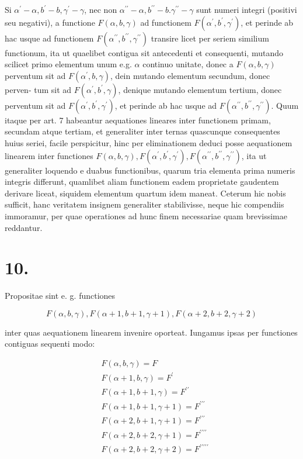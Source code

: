 \documentclass[twoside,12pt, showframe]{memoir}
\begin{document}
Si \(\alpha^{\prime}-\alpha, b^{\prime}-b, \gamma^{\prime}-\gamma\), nec non \(\alpha^{\prime \prime}-\alpha, b^{\prime \prime}-b . \gamma^{\prime \prime}-\gamma\) sunt numeri integri (positivi seu negativi), a functione \(F(\alpha, b, \gamma)\) ad functionem \(F\left(\alpha^{\prime}, b^{\prime}, \gamma^{\prime}\right)\), et perinde ab hac usque ad functionem \(F\left(\alpha^{\prime \prime}, b^{\prime \prime}, \gamma^{\prime \prime}\right)\) transire licet per seriem similium functionum, ita ut quaelibet contigua sit antecedenti et consequenti, mutando scilicet primo elementum unum e.g. \(\alpha\) continuo unitate, donec a \(F(\alpha, b, \gamma)\) perventum sit ad \(F\left(\alpha^{\prime}, b, \gamma\right)\), dein mutando elementum secundum, donec perven-
tum sit ad \(F\left(\alpha^{\prime}, b^{\prime}, \gamma\right)\), denique mutando elementum tertium, donec perventum sit ad \(F\left(\alpha^{\prime}, b^{\prime}, \gamma^{\prime}\right)\), et perinde ab hac usque ad \(F\left(\alpha^{\prime \prime}, b^{\prime \prime}, \gamma^{\prime \prime}\right)\). Quum itaque per art. 7 habeantur aequationes lineares inter functionem primam, secundam atque tertiam, et generaliter inter ternas quascunque consequentes huius seriei, facile perspicitur, hinc per eliminationem deduci posse aequationem linearem inter functiones \(F(\alpha, b, \gamma), F\left(\alpha^{\prime}, b^{\prime}, \gamma^{\prime}\right), F\left(\alpha^{\prime \prime}, b^{\prime \prime}, \gamma^{\prime \prime}\right)\), ita ut generaliter loquendo e duabus functionibus, quarum tria elementa prima numeris integris differunt, quamlibet aliam functionem eadem proprietate gaudentem derivare liceat, siquidem elementum quartum idem maneat. Ceterum hic nobis sufficit, hanc veritatem insignem generaliter stabilivisse, neque hic compendiis immoramur, per quae operationes ad hunc finem necessariae quam brevissimae reddantur.

\section*{10.}
Propositae sint e. g. functiones

\[
F(\alpha, b, \gamma), F(\alpha+1, b+1, \gamma+1), F(\alpha+2, b+2, \gamma+2)
\]

inter quas aequationem linearem invenire oporteat. Iungamus ipsas per functiones contiguas sequenti modo:

\[
\begin{aligned}
& F(\alpha, b, \gamma)=F \\
& F(\alpha+1, b, \gamma)=F^{\prime} \\
& F(\alpha+1, b+1, \gamma)=F^{\prime \prime} \\
& F(\alpha+1, b+1, \gamma+1)=F^{\prime \prime \prime} \\
& F(\alpha+2, b+1, \gamma+1)=F^{\prime \prime \prime} \\
& F(\alpha+2, b+2, \gamma+1)=F^{\prime \prime \prime \prime} \\
& F(\alpha+2, b+2, \gamma+2)=F^{\prime \prime \prime \prime \prime}
\end{aligned}
\]
\end{document}

